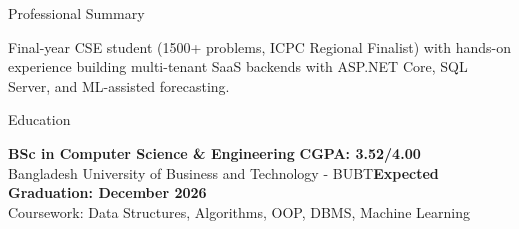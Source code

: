 \documentclass{resume}
\begin{document}

\begin{rSection}{Professional Summary}

Final-year CSE student (1500+ problems, ICPC Regional Finalist) with hands-on experience building multi-tenant SaaS backends with ASP.NET Core, SQL Server, and ML-assisted forecasting.

\end{rSection}


\begin{rSection}{Education}

{\bf BSc in Computer Science \& Engineering} \hfill{\bf CGPA: 3.52/4.00} \\
Bangladesh University of Business and Technology - BUBT\hfill {\bf Expected Graduation: December 2026} \\
{\footnotesize Coursework: Data Structures, Algorithms, OOP, DBMS, Machine Learning}

\end{rSection}
\end{document}
